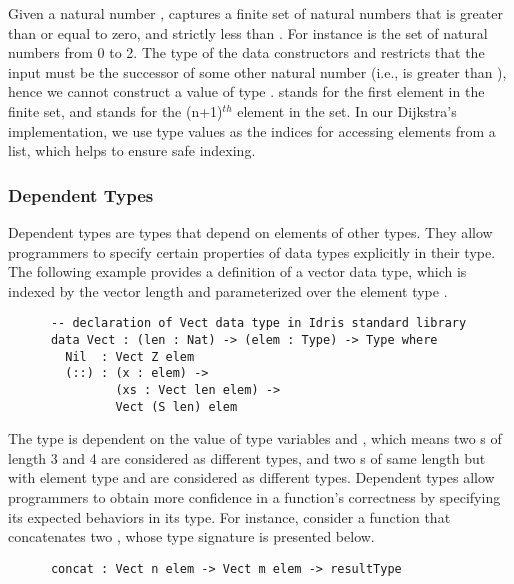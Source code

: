 Given a natural number ,  captures a finite set of natural numbers that is greater than or equal to zero, and strictly less than . For instance  is the set of natural numbers from 0 to 2. The type of the data constructors  and  restricts that the input   must be the successor of some other natural number  (i.e.,  is greater than ), hence we cannot construct a value of type .  stands for the first element in the finite set, and  stands for the (n+1)$^{th}$ element in the set. In our Dijkstra's implementation, we use  type values as the indices for accessing elements from a list, which helps to ensure safe indexing. 

\subsubsection*{Dependent Types}
Dependent types are types that depend on elements of other types\cite{Bove}. They allow programmers to specify certain properties of data types explicitly in their type. The following example provides a definition of a vector data type, which is indexed by the vector length  and parameterized over the element type .
\begin{lstlisting}
      -- declaration of Vect data type in Idris standard library
      data Vect : (len : Nat) -> (elem : Type) -> Type where
        Nil  : Vect Z elem
        (::) : (x : elem) -> 
               (xs : Vect len elem) -> 
               Vect (S len) elem
\end{lstlisting}

The type  is dependent on the value of type variables  and , which means two s of length 3 and 4 are considered as different types, and two s of same length but with element type  and  are considered as different types. Dependent types allow programmers to obtain more confidence in a function's correctness by specifying its expected behaviors in its type. For instance, consider a function  that concatenates two , whose type signature is presented below. 
\begin{lstlisting}
      concat : Vect n elem -> Vect m elem -> resultType
\end{lstlisting}


